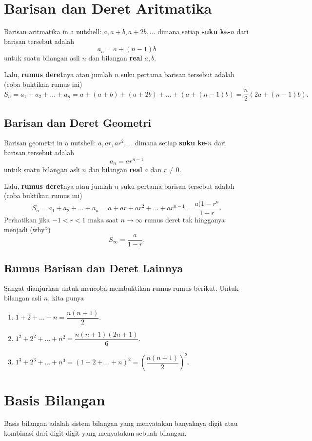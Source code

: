 \section{Barisan dan Deret Aritmatika}
    Barisan aritmatika in a nutshell: $a,a+b,a+2b,\dots$ dimana setiap \textbf{suku ke-$n$} dari barisan tersebut adalah $$a_n=a+(n-1)b$$ untuk suatu bilangan asli $n$ dan bilangan \textbf{real} $a,b$.
    
    Lalu, \textbf{rumus deret}nya atau jumlah $n$ suku pertama barisan tersebut adalah (coba buktikan rumus ini) $$S_n = a_1+a_2+\dots+a_n=a+(a+b)+(a+2b)+\dots+(a+(n-1)b)=\dfrac{n}{2}(2a+(n-1)b).$$
    
    \subsection{Barisan dan Deret Geometri}
     Barisan geometri in a nutshell: $a,ar,ar^2,\dots$ dimana setiap \textbf{suku ke-$n$} dari barisan tersebut adalah $$a_n=ar^{n-1}$$ untuk suatu bilangan asli $n$ dan bilangan \textbf{real} $a$ dan $r \neq 0$.
    
    Lalu, \textbf{rumus deret}nya atau jumlah $n$ suku pertama barisan tersebut adalah (coba buktikan rumus ini) $$S_n = a_1+a_2+\dots+a_n=a+ar+ar^2+\dots+ar^{n-1}=\dfrac{a(1-r^n}{1-r}.$$
    Perhatikan jika $-1 < r < 1$ maka saat $n \rightarrow \infty$ rumus deret tak hingganya menjadi (why?) $$S_\infty =  \dfrac{a}{1-r}.$$
    
    \subsection{Rumus Barisan dan Deret Lainnya}
    Sangat dianjurkan untuk mencoba membuktikan rumus-rumus berikut. Untuk bilangan asli $n$, kita punya
    \begin{enumerate}
        \item $1+2+\dots+n = \dfrac{n(n+1)}{2}.$
        \item $1^2+2^2+\dots+n^2 = \dfrac{n(n+1)(2n+1)}{6}.$
        \item $1^3+2^3+\dots+n^3 = \left(1+2+\dots+n\right)^2= \left(\dfrac{n(n+1)}{2}\right)^2.$
    \end{enumerate}
    
    \section{Basis Bilangan}
        Basis bilangan adalah sistem bilangan yang menyatakan banyaknya digit atau kombinasi dari digit-digit yang menyatakan sebuah bilangan.
        
